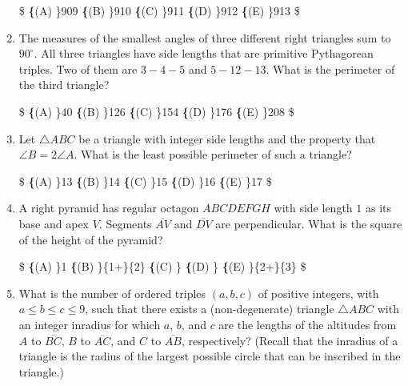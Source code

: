 \documentclass{article}
\begin{document}
\begin{enumerate}[label=\arabic*., itemsep=0.5em]
\$
\textbf\{(A) \}909\qquad
\textbf\{(B) \}910\qquad
\textbf\{(C) \}911\qquad
\textbf\{(D) \}912\qquad
\textbf\{(E) \}913\qquad
\$\par \vspace{0.5em}\item The measures of the smallest angles of three different right triangles sum to $90^\circ$. All three triangles have side lengths that are primitive Pythagorean triples. Two of them are $3-4-5$ and $5-12-13$. What is the perimeter of the third triangle?

\$
\textbf\{(A) \}40 \qquad
\textbf\{(B) \}126 \qquad
\textbf\{(C) \}154 \qquad
\textbf\{(D) \}176 \qquad
\textbf\{(E) \}208 \qquad
\$\par \vspace{0.5em}\item Let $\triangle{ABC}$ be a triangle with integer side lengths and the property that $\angle{B} = 2\angle{A}$. What is the least possible perimeter of such a triangle?

\$
\textbf\{(A) \}13 \qquad
\textbf\{(B) \}14 \qquad
\textbf\{(C) \}15 \qquad
\textbf\{(D) \}16 \qquad
\textbf\{(E) \}17 \qquad
\$\par \vspace{0.5em}\item A right pyramid has regular octagon $ABCDEFGH$ with side length $1$ as its base and apex $V.$ Segments $\overline{AV}$ and $\overline{DV}$ are perpendicular. What is the square of the height of the pyramid?

\$
\textbf\{(A) \}1 \qquad
\textbf\{(B) \}\frac\{1+\}\{2\} \qquad
\textbf\{(C) \} \qquad
\textbf\{(D) \} \qquad
\textbf\{(E) \}\frac\{2+\}\{3\} \qquad
\$\par \vspace{0.5em}\item What is the number of ordered triples $(a,b,c)$ of positive integers, with $a\le b\le c\le 9$, such that there exists a (non-degenerate) triangle $\triangle ABC$ with an integer inradius for which $a$, $b$, and $c$ are the lengths of the altitudes from $A$ to $\overline{BC}$, $B$ to $\overline{AC}$, and $C$ to $\overline{AB}$, respectively? (Recall that the inradius of a triangle is the radius of the largest possible circle that can be inscribed in the triangle.)


\end{enumerate}
\end{document}
